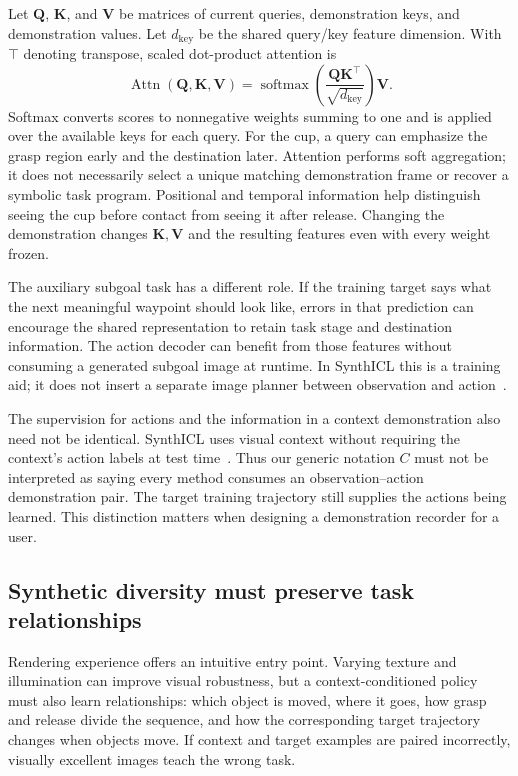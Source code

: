 Let $\mathbf Q$, $\mathbf K$, and $\mathbf V$ be matrices of current queries, demonstration keys, and demonstration values. Let $d_{\mathrm{key}}$ be the shared query/key feature dimension. With $\top$ denoting transpose, scaled dot-product attention is
\begin{equation}
 \operatorname{Attn}(\mathbf Q,\mathbf K,\mathbf V)=\operatorname{softmax}
 \left(\frac{\mathbf Q\mathbf K^\top}{\sqrt{d_{\mathrm{key}}}}\right)\mathbf V.
 \label{eq:attention}
\end{equation}
Softmax converts scores to nonnegative weights summing to one and is applied over the available keys for each query. For the cup, a query can emphasize the grasp region early and the destination later. Attention performs soft aggregation; it does not necessarily select a unique matching demonstration frame or recover a symbolic task program. Positional and temporal information help distinguish seeing the cup before contact from seeing it after release. Changing the demonstration changes $\mathbf K,\mathbf V$ and the resulting features even with every weight frozen.

The auxiliary subgoal task has a different role. If the training target says what the next meaningful waypoint should look like, errors in that prediction can encourage the shared representation to retain task stage and destination information. The action decoder can benefit from those features without consuming a generated subgoal image at runtime. In SynthICL this is a training aid; it does not insert a separate image planner between observation and action~\citep{synthicl}.

The supervision for actions and the information in a context demonstration also need not be identical. SynthICL uses visual context without requiring the context's action labels at test time~\citep{synthicl}. Thus our generic notation $C$ must not be interpreted as saying every method consumes an observation--action demonstration pair. The target training trajectory still supplies the actions being learned. This distinction matters when designing a demonstration recorder for a user.

\subsection{Synthetic diversity must preserve task relationships}
Rendering experience offers an intuitive entry point. Varying texture and illumination can improve visual robustness, but a context-conditioned policy must also learn relationships: which object is moved, where it goes, how grasp and release divide the sequence, and how the corresponding target trajectory changes when objects move. If context and target examples are paired incorrectly, visually excellent images teach the wrong task.

